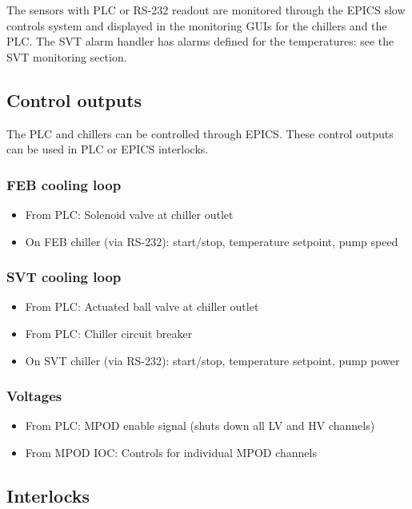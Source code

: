 \documentclass[12pt]{report}
\begin{document}
The sensors with PLC or RS-232 readout are monitored through the EPICS slow controls system and displayed in the monitoring GUIs for the chillers and the PLC.
The SVT alarm handler has alarms defined for the temperatures: see the SVT monitoring section.

\subsection{Control outputs}
The PLC and chillers can be controlled through EPICS. These control outputs can be used in PLC or EPICS interlocks.
\subsubsection*{FEB cooling loop}
\begin{itemize}
    \item From PLC: Solenoid valve at chiller outlet
    \item On FEB chiller (via RS-232): start/stop, temperature setpoint, pump speed
\end{itemize}
\subsubsection*{SVT cooling loop}
\begin{itemize}
    \item From PLC: Actuated ball valve at chiller outlet
    \item From PLC: Chiller circuit breaker
    \item On SVT chiller (via RS-232): start/stop, temperature setpoint, pump power
\end{itemize}
\subsubsection*{Voltages}
\begin{itemize}
    \item From PLC: MPOD enable signal (shuts down all LV and HV channels)
    \item From MPOD IOC: Controls for individual MPOD channels
\end{itemize}



\subsection{Interlocks}
\label{sec:svt_power_monitoring_alarm_interlocks}
\end{document}
